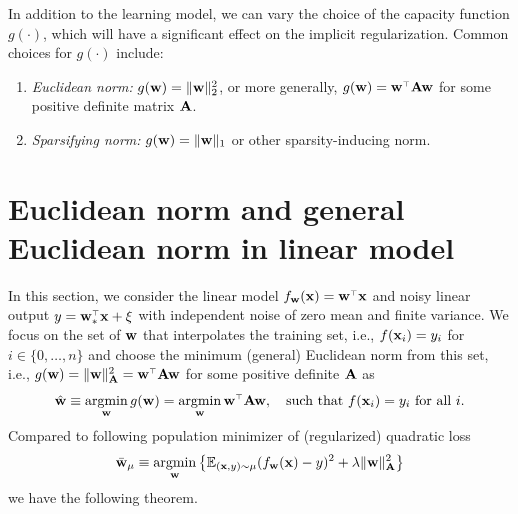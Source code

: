 \documentclass[11pt]{article}
\begin{document}
In addition to the learning model, we can vary the choice of the
capacity function $g(\cdot)$, which will have a significant effect on
the implicit regularization. Common choices for $g(\cdot)$ include:
\begin{enumerate}
  \item \emph{Euclidean norm:} $g(\mathbf w) = \|\mathbf w\|_2^2$, or more
    generally, $g(\w)=\w^\top \A \w$ for some positive definite matrix $\mathbf A$.
    \item \emph{Sparsifying norm:} $g(\mathbf w)=\|\mathbf w\|_1$ or other sparsity-inducing norm.
\end{enumerate}

\section{Euclidean norm and general Euclidean norm in linear model}

In this section, we consider the linear model $f_\w(\x) = \w^\top \x$ and noisy linear output $y = \w_*^\top \x + \xi$ with independent noise of zero mean and finite variance. We focus on the set of $\mathbf w$ that interpolates the training set, i.e., $f(\mathbf x_i) = y_i$ for $i \in \{0, \ldots, n\}$ and choose the minimum (general) Euclidean norm from this set, i.e., $g(\w) = \| \w \|_\A^2 = \w^\top \A \w$ for some positive definite $\mathbf A$ as
\[
  \hat \w \equiv \argmin_\w g(\w) = \argmin_\w \w^\top \A \w, \quad \textmd{such that $f(\x_i) = y_i$ for all $i$}.
\]
Compared to following population minimizer of (regularized) quadratic loss
\[
  \bar {\mathbf w}_\mu \equiv \operatorname*{\mathop{\mathrm{argmin}}}_\mathbf w \left\{ \mathbb E_{(\mathbf x,y) \sim \mu} (f_\mathbf w(\mathbf x) - y)^2 + \lambda \| \mathbf w \|_\mathbf A^2 \right\}
\]
we have the following theorem.
\end{document}
